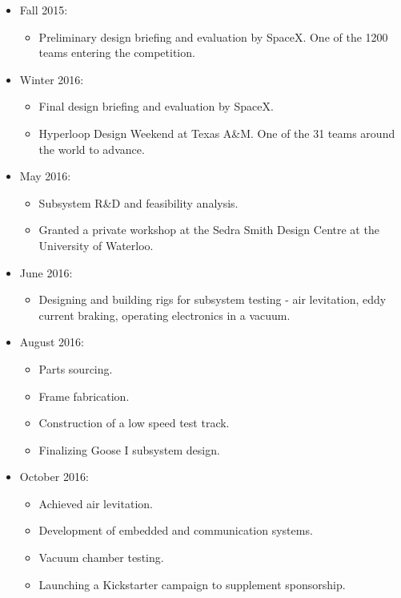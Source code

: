 \documentclass[main.tex]{subfiles}
\begin{document}
\begin{flushleft}
\begin{itemize}
\item Fall 2015:
\begin{itemize}
    \item Preliminary design briefing and evaluation by SpaceX. One of the 1200 teams entering the competition.
\end{itemize}

\item Winter 2016:
\begin{itemize}
    \item Final design briefing and evaluation by SpaceX.
    \item Hyperloop Design Weekend at Texas A\&M. One of the 31 teams around the world to advance.
\end{itemize}

\item May 2016:
\begin{itemize}
    \item Subsystem R\&D and feasibility analysis.
    \item Granted a private workshop at the Sedra Smith Design Centre at the University of Waterloo.
\end{itemize}

\item June 2016:
\begin{itemize}
    \item Designing and building rigs for subsystem testing - air levitation, eddy current braking, operating electronics in a vacuum.
\end{itemize}

\item August 2016:
\begin{itemize}
    \item Parts sourcing.
    \item Frame fabrication.
    \item Construction of a low speed test track.
    \item Finalizing Goose I subsystem design.
\end{itemize}

\item October 2016:
\begin{itemize}
    \item Achieved air levitation.
    \item Development of embedded and communication systems.
    \item Vacuum chamber testing.
    \item Launching a Kickstarter campaign to supplement sponsorship.
\end{itemize}


\end{itemize}
\end{flushleft}
\end{document}
